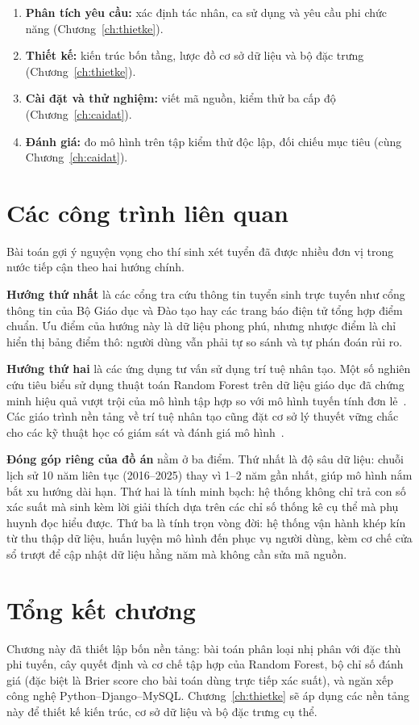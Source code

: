 \begin{enumerate}[leftmargin=1.6em, itemsep=3pt]
  \item \textbf{Phân tích yêu cầu:} xác định tác nhân, ca sử dụng và yêu cầu
        phi chức năng (Chương~\ref{ch:thietke}).
  \item \textbf{Thiết kế:} kiến trúc bốn tầng, lược đồ cơ sở dữ liệu và bộ đặc
        trưng (Chương~\ref{ch:thietke}).
  \item \textbf{Cài đặt và thử nghiệm:} viết mã nguồn, kiểm thử ba cấp độ
        (Chương~\ref{ch:caidat}).
  \item \textbf{Đánh giá:} đo mô hình trên tập kiểm thử độc lập, đối chiếu mục
        tiêu (cùng Chương~\ref{ch:caidat}).
\end{enumerate}

\section{Các công trình liên quan}

Bài toán gợi ý nguyện vọng cho thí sinh xét tuyển đã được nhiều đơn vị trong
nước tiếp cận theo hai hướng chính.

\textbf{Hướng thứ nhất} là các cổng tra cứu thông tin tuyển sinh trực tuyến
như cổng thông tin của Bộ Giáo dục và Đào tạo hay các trang báo điện tử tổng
hợp điểm chuẩn. Ưu điểm của hướng này là dữ liệu phong phú, nhưng nhược điểm
là chỉ hiển thị bảng điểm thô: người dùng vẫn phải tự so sánh và tự phán đoán
rủi ro.

\textbf{Hướng thứ hai} là các ứng dụng tư vấn sử dụng trí tuệ nhân tạo. Một số
nghiên cứu tiêu biểu sử dụng thuật toán Random Forest trên dữ liệu giáo dục đã
chứng minh hiệu quả vượt trội của mô hình tập hợp so với mô hình tuyến tính
đơn lẻ~\cite{Breiman2001,Hastie2009}. Các giáo trình nền tảng về trí tuệ nhân
tạo cũng đặt cơ sở lý thuyết vững chắc cho các kỹ thuật học có giám sát và
đánh giá mô hình~\cite{HoangKiem,RussellNorvig2021}.

\textbf{Đóng góp riêng của đồ án} nằm ở ba điểm. Thứ nhất là độ sâu dữ liệu:
chuỗi lịch sử 10 năm liên tục (2016--2025) thay vì 1--2 năm gần nhất, giúp mô
hình nắm bắt xu hướng dài hạn. Thứ hai là tính minh bạch: hệ thống không chỉ
trả con số xác suất mà sinh kèm lời giải thích dựa trên các chỉ số thống kê cụ
thể mà phụ huynh đọc hiểu được. Thứ ba là tính trọn vòng đời: hệ thống vận hành
khép kín từ thu thập dữ liệu, huấn luyện mô hình đến phục vụ người dùng, kèm cơ
chế cửa sổ trượt để cập nhật dữ liệu hằng năm mà không cần sửa mã nguồn.

\section{Tổng kết chương}

Chương này đã thiết lập bốn nền tảng: bài toán phân loại nhị phân với đặc thù
phi tuyến, cây quyết định và cơ chế tập hợp của Random Forest, bộ chỉ số đánh
giá (đặc biệt là Brier score cho bài toán dùng trực tiếp xác suất), và ngăn xếp
công nghệ Python--Django--MySQL. Chương~\ref{ch:thietke} sẽ áp dụng các nền
tảng này để thiết kế kiến trúc, cơ sở dữ liệu và bộ đặc trưng cụ thể.
